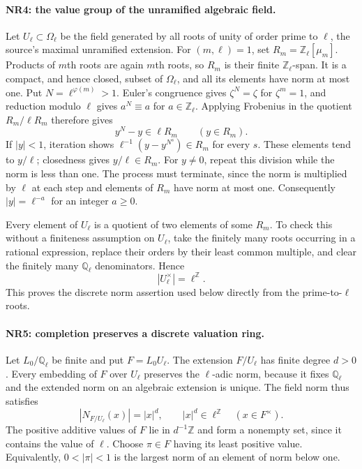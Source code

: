 \paragraph{NR4: the value group of the unramified algebraic field.}
Let $U_\ell\subset\Omega_\ell$ be the field generated by all roots of
unity of order prime to $\ell$, the source's maximal unramified
extension. For $(m,\ell)=1$, set
$R_m=\mathbb Z_\ell[\mu_m]$. Products of $m$th roots are again $m$th
roots, so $R_m$ is their finite $\mathbb Z_\ell$-span. It is a compact,
and hence closed, subset of $\Omega_\ell$, and all its elements have
norm at most one. Put $N=\ell^{\varphi(m)}>1$. Euler's congruence
gives $\zeta^N=\zeta$ for $\zeta^m=1$, and reduction modulo $\ell$
gives $a^N\equiv a$ for $a\in\mathbb Z_\ell$. Applying Frobenius in
the quotient $R_m/\ell R_m$ therefore gives
\[
                   y^N-y\in\ell R_m\qquad(y\in R_m).  \tag{NR.6}
\]
If $|y|<1$, iteration shows
$\ell^{-1}(y-y^{N^s})\in R_m$ for every $s$. These elements tend
to $y/\ell$; closedness gives $y/\ell\in R_m$.
For $y\ne0$, repeat this division while the norm is less than one.
The process must terminate, since the norm is multiplied by $\ell$
at each step and elements of $R_m$ have norm at most one. Consequently
$|y|=\ell^{-a}$ for an integer $a\ge0$.

Every element of $U_\ell$ is a quotient of two elements of some
$R_m$. To check this without a finiteness assumption on $U_\ell$,
take the finitely many roots occurring in a rational expression,
replace their orders by their least common multiple, and clear the
finitely many $\mathbb Q_\ell$ denominators. Hence
\[
                        |U_\ell^\times|=\ell^{\mathbb Z}.
                                                               \tag{NR.7}
\]
This proves the discrete norm assertion used below directly from
the prime-to-$\ell$ roots.

\paragraph{NR5: completion preserves a discrete valuation ring.}
Let $L_0/\mathbb Q_\ell$ be finite and put $F=L_0U_\ell$.
The extension $F/U_\ell$ has finite degree $d>0$. Every embedding
of $F$ over $U_\ell$ preserves the $\ell$-adic norm, because it fixes
$\mathbb Q_\ell$ and the extended norm on an algebraic extension is
unique. The field norm thus satisfies
\[
 |N_{F/U_\ell}(x)|=|x|^d,\qquad
 |x|^d\in\ell^{\mathbb Z}\quad(x\in F^\times).         \tag{NR.8}
\]
The positive additive values of $F$ lie in $d^{-1}\mathbb Z$ and
form a nonempty set, since it contains the value of $\ell$.
Choose $\pi\in F$ having its least positive value. Equivalently,
$0<|\pi|<1$ is the largest norm of an element of norm below one.

